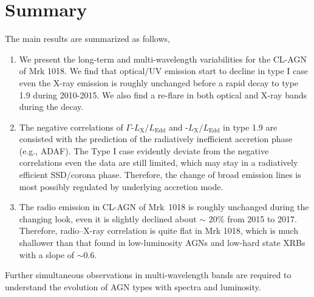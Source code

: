 \section{Summary}
\label{sec:conclusion}
The main results are summarized as follows,
\begin{enumerate}

\item We present the long-term and multi-wavelength variabilities for the CL-AGN of Mrk 1018. We find that optical/UV emission start to decline in type I case even the X-ray emission is roughly unchanged before a rapid decay to type 1.9 during 2010-2015. We also find a re-flare in both optical and X-ray bands during the decay.   

\item The negative correlations of $\Gamma$-$L_\mathrm{X}/L_\mathrm{Edd}$ and \alphaox-$L_\mathrm{X}/L_\mathrm{Edd}$ in type 1.9 are consisted with the prediction of the radiatively inefficient accretion phase (e.g., ADAF). The Type I case evidently deviate from the negative correlations even the data are still limited, which may stay in a radiatively efficient SSD/corona phase. Therefore, the change of broad emission lines is most possibly regulated by underlying accretion mode. 

\item The radio emission in CL-AGN of Mrk~1018 is roughly unchanged during the changing look, even it is slightly declined about $\sim$ 20\% from 2015 to 2017. Therefore, radio--X-ray correlation is quite flat in Mrk 1018, which is much shallower than that found in low-luminosity AGNs and low-hard state XRBs with a slope of $\sim 0.6$. 

\end{enumerate}
 Further simultaneous observations in multi-wavelength bands are required to understand the evolution of AGN types with spectra and luminosity. 
 